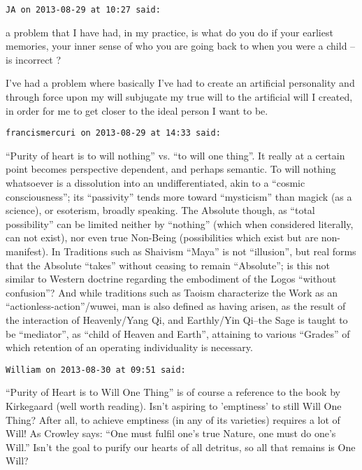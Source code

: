 \begin{footnotesize}\begin{sffamily}



\texttt{JA on 2013-08-29 at 10:27 said: }

a problem that I have had, in my practice, is what do you do if your earliest memories, your inner sense of who you are going back to when you were a child – is incorrect ?

I've had a problem where basically I've had to create an artificial personality and through force upon my will subjugate my true will to the artificial will I created, in order for me to get closer to the ideal person I want to be.


\hfill

\texttt{francismercuri on 2013-08-29 at 14:33 said: }

“Purity of heart is to will nothing” vs. “to will one thing”. It really at a certain point becomes perspective dependent, and perhaps semantic. To will nothing whatsoever is a dissolution into an undifferentiated, akin to a “cosmic consciousness”; its “passivity” tends more toward “mysticism” than magick (as a science), or esoterism, broadly speaking. The Absolute though, as “total possibility” can be limited neither by “nothing” (which when considered literally, can not exist), nor even true Non-Being (possibilities which exist but are non-manifest). In Traditions such as Shaivism “Maya” is not “illusion”, but real forms that the Absolute “takes” without ceasing to remain “Absolute”; is this not similar to Western doctrine regarding the embodiment of the Logos “without confusion”? And while traditions such as Taoism characterize the Work as an “actionless-action”/wuwei, man is also defined as having arisen, as the result of the interaction of Heavenly/Yang Qi, and Earthly/Yin Qi–the Sage is taught to be “mediator”, as “child of Heaven and Earth”, attaining to various “Grades” of which retention of an operating individuality is necessary.


\hfill

\texttt{William on 2013-08-30 at 09:51 said: }

“Purity of Heart is to Will One Thing” is of course a reference to the book by Kirkegaard (well worth reading). Isn't aspiring to 'emptiness' to still Will One Thing? After all, to achieve emptiness (in any of its varieties) requires a lot of Will! As Crowley says: “One must fulfil one's true Nature, one must do one's Will.” Isn't the goal to purify our hearts of all detritus, so all that remains is One Will?


\end{sffamily}\end{footnotesize}

